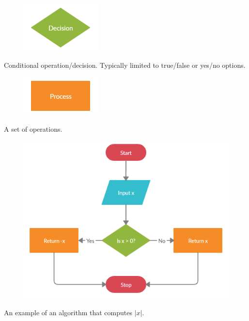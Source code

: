 \documentclass{ximera}
\begin{document}
\begin{figure}
	\includegraphics{decision.png}
\end{figure}
\begin{center}
	Conditional operation/decision. Typically limited to true/false or yes/no options.
\end{center}

\begin{figure}
	\includegraphics{process.png}
\end{figure}
\begin{center}
	A set of operations.
\end{center}

\begin{figure}
	\includegraphics{absalgo.png}
\end{figure}
\begin{center}
	An example of an algorithm that computes $|x|$.
\end{center}
\end{document}

